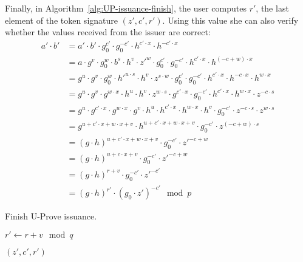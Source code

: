 Finally, in Algorithm~\ref{alg:UP-issuance-finish}, the user computes $r'$, the
last element of the token signature $(z', c', r')$. Using this value she can
also verify whether the values received from the issuer are correct:
\begin{align*}
  a' \cdot b'
  & = a' \cdot b' \cdot g_0^{c'} \cdot g_0^{-c'} \cdot h^{c' \cdot x} \cdot h^{-c' \cdot x} \\
  & = a \cdot g^v \cdot g_0^w \cdot b^s \cdot h^v \cdot z'^w  \cdot g_0^{c'} \cdot g_0^{-c'} \cdot h^{c' \cdot x} \cdot h^{(-c + w) \cdot x} \\
  & = g^u \cdot g^v \cdot g_0^w \cdot h'^{u \cdot s} \cdot h^v \cdot z^{s \cdot w} \cdot g_0^{c'} \cdot g_0^{-c'} \cdot h^{c' \cdot x} \cdot h^{-c \cdot x} \cdot h^{w \cdot x} \\
  & = g^u \cdot g^v \cdot g^{w \cdot x} \cdot h^u \cdot h^v \cdot z^{w \cdot s} \cdot g^{c' \cdot x} \cdot g_0^{-c'}  \cdot h^{c' \cdot x} \cdot h^{w \cdot x} \cdot z^{-c \cdot s} \\
  & = g^u \cdot g^{c' \cdot x} \cdot g^{w \cdot x} \cdot g^v \cdot h^u \cdot h^{c' \cdot x} \cdot h^{w \cdot x} \cdot h^v \cdot g_0^{-c'} \cdot z^{-c \cdot s} \cdot z^{w \cdot s} \\
  & = g^{u + c' \cdot x + w \cdot x + v} \cdot h^{u + c' \cdot x + w \cdot x + v} \cdot g_0^{-c'} \cdot z^{(-c + w) \cdot s} \\
  & = (g \cdot h)^{u + c' \cdot x + w \cdot x + v} \cdot g_0^{-c'} \cdot z'^{-c + w} \\
  & = (g \cdot h)^{u + c \cdot x + v} \cdot g_0^{-c'} \cdot z'^{-c + w} \\
  & = (g \cdot h)^{r + v} \cdot g_0^{-c'} \cdot z'^{-c'} \\
  & = (g \cdot h)^{r'} \cdot (g_0 \cdot z')^{-c'} \mod p
\end{align*}

\begin{algorithm}
  \caption{Finish U-Prove issuance.}
  \label{alg:UP-issuance-finish}
  \addtolength{\baselineskip}{1mm}
  \begin{algorithmic}[1]
      \State $r' \gets r + v \mod q$

        \Return {}
      \EndIf

      \Return $(z', c', r')$
    \EndFunction
  \end{algorithmic}
\end{algorithm}

